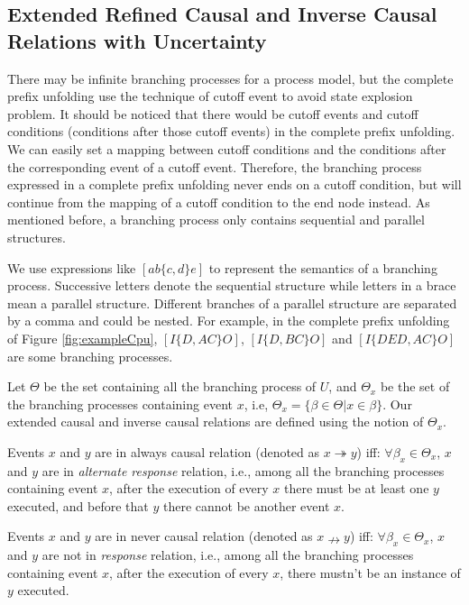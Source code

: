 \documentclass{llncs}
\begin{document}
\subsection{Extended Refined Causal and Inverse Causal Relations with Uncertainty}\label{subsec:causalAndInverseCausal}
There may be infinite branching processes for a process model, but the complete prefix unfolding use the technique of cutoff event to avoid state explosion problem. It should be noticed that there would be cutoff events and cutoff conditions (conditions after those cutoff events) in the complete prefix unfolding. We can easily set a mapping between cutoff conditions and the conditions after the corresponding event of a cutoff event. Therefore, the branching process expressed in a complete prefix unfolding never ends on a cutoff condition, but will continue from the mapping of a cutoff condition to the end node instead. As mentioned before, a branching process only contains sequential and parallel structures.

We use expressions like $[ab\{c,d\}e]$ to represent the semantics of a branching process. Successive letters denote the sequential structure while letters in a brace mean a parallel structure. Different branches of a parallel structure are separated by a comma and could be nested. For example, in the complete prefix unfolding of Figure \ref{fig:exampleCpu}, $[I\{D,AC\}O]$, $[I\{D,BC\}O]$ and $[I\{DED,AC\}O]$ are some branching processes.

Let $\Theta$ be the set containing all the branching process of $U$, and $\Theta_{x}$ be the set of the branching processes containing event $x$, i.e, $\Theta_{x}=\{\beta\in\Theta|x\in\beta\}$. Our extended causal and inverse causal relations are defined using the notion of $\Theta_{x}$.

\begin{definition}\label{def:alwaysCausal}
Events $x$ and $y$ are in always causal relation (denoted as $x\twoheadrightarrow y$) iff: $\forall\beta_{x}\in\Theta_{x}$, $x$ and $y$ are in \textit{alternate response} relation, i.e., among all the branching processes containing event $x$, after the execution of every $x$ there must be at least one $y$ executed, and before that $y$ there cannot be another event $x$.
\end{definition}

\begin{definition}\label{def:neverCausal}
Events $x$ and $y$ are in never causal relation (denoted as $x\nrightarrow y$) iff: $\forall\beta_{x}\in\Theta_{x}$, $x$ and $y$ are not in \textit{response} relation, i.e., among all the branching processes containing event $x$, after the execution of every $x$, there mustn't be an instance of $y$ executed.
\end{definition}
\end{document}
